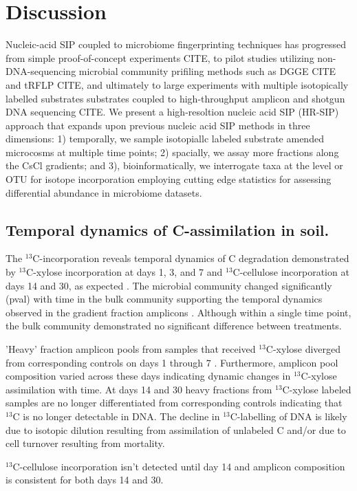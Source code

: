 \section{Discussion}
Nucleic-acid SIP coupled to microbiome fingerprinting techniques has progressed
from simple proof-of-concept experiments CITE, to pilot studies utilizing
non-DNA-sequencing microbial community prifiling methods such as DGGE CITE and
tRFLP CITE, and ultimately to large experiments with multiple isotopically 
labelled substrates substrates coupled to high-throughput amplicon and 
shotgun DNA sequencing CITE. We present a high-resoltion nucleic acid SIP (HR-SIP) 
approach that expands upon previous nucleic acid SIP methods in three dimensions:
1) temporally, we sample isotopiallc labeled substrate amended microcosms at multiple 
time points; 2) spacially, we assay more fractions along the CsCl gradients; and 3), 
bioinformatically, we interrogate taxa at the level or OTU for isotope incorporation
employing cutting edge statistics for assessing differential abundance in microbiome
datasets.

\subsection{Temporal dynamics of C-assimilation in soil.}  
The $^{13}$C-incorporation reveals temporal dynamics of C degradation
demonstrated by $^{13}$C-xylose incorporation at days 1, 3, and 7 and
$^{13}$C-cellulose incorporation at days 14 and 30, as expected
\citep{Amelung_2008}. The microbial community changed significantly (pval) with
time in the bulk community supporting the temporal dynamics observed in the
gradient fraction amplicons . Although within a single time point, the bulk
community demonstrated no significant difference between treatments. 

'Heavy' fraction amplicon pools from samples that received $^{13}$C-xylose
diverged from corresponding controls on days 1 through 7 . Furthermore,
amplicon pool composition varied across these days indicating dynamic changes
in $^{13}$C-xylose assimilation with time. At days 14 and 30 heavy fractions
from $^{13}$C-xylose labeled samples are no longer differentiated from
corresponding controls indicating that $^{13}$C is no longer detectable in DNA.
The decline in $^{13}$C-labelling of DNA is likely due to isotopic dilution
resulting from assimilation of unlabeled C and/or due to cell turnover
resulting from mortality. 

$^{13}$C-cellulose incorporation isn't detected until day 14 and amplicon
composition is consistent for both days 14 and 30.

